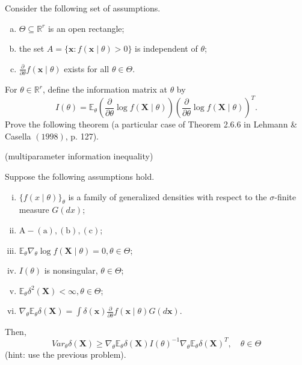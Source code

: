 \begin{ex}
    Consider the following set of assumptions. 
    \begin{enumerate}[(a)]
        \item \(\Theta \subseteq \mathbb{R}^{r}\) is an open rectangle; 
        \item the set
        \(
            A=\{\mathbf{x}: f(\mathbf{x} \mid \theta)>0\}
        \)
        is independent of \(\theta\); 
        \item \(\frac{\partial}{\partial \theta} f(\mathbf{x} \mid \theta)\) exists for all \(\theta \in \Theta\). 
    \end{enumerate}
    For \(\theta \in \mathbb{R}^{r}\), define the information matrix at \(\theta\) by
    \[
        I(\theta)=\mathbb{E}_{\theta}\left(\frac{\partial}{\partial \theta} \log f(\mathbf{X} \mid \theta)\right)\left(\frac{\partial}{\partial \theta} \log f(\mathbf{X} \mid \theta)\right)^T. 
    \]
    Prove the following theorem (a particular case of Theorem 2.6.6 in Lehmann \& Casella \((1998)\), p. 127). 

     (multiparameter information inequality) 
    
    Suppose the following assumptions hold. 
    \begin{enumerate}[(i)]
        \item \(\{f(x \mid \theta)\}_{\theta}\) is a family of generalized densities with respect to the \(\sigma\)-finite measure \(G(d x)\); 
        \item \(\mathrm{A}-(\mathrm{a}),(\mathrm{b}),(\mathrm{c})\); 
        \item \(\mathbb{E}_{\theta} \nabla_{\theta} \log f(\boldsymbol{X} \mid \theta)=0, \theta \in \Theta\);  
        \item \(I(\theta)\) is nonsingular, \(\theta \in \Theta\); 
        \item \(\mathbb{E}_{\theta} \delta^{2}(\boldsymbol{X})<\infty, \theta \in \Theta\); 
        \item \(\nabla_{\theta} \mathbb{E}_{\theta} \delta(\boldsymbol{X})=\int \delta(\boldsymbol{x}) \frac{\partial}{\partial \theta} f(\boldsymbol{x} \mid \theta) G(d \boldsymbol{x})\). 
    \end{enumerate}
    Then,
    \[
         Var_{\theta} \delta(\boldsymbol{X}) \geq \nabla_{\theta} \mathbb{E}_{\theta} \delta(\boldsymbol{X}) I(\theta)^{-1} \nabla_{\theta} \mathbb{E}_{\theta} \delta(\boldsymbol{X})^T, \quad \theta \in \Theta
    \]
    (hint: use the previous problem).
\end{ex}

